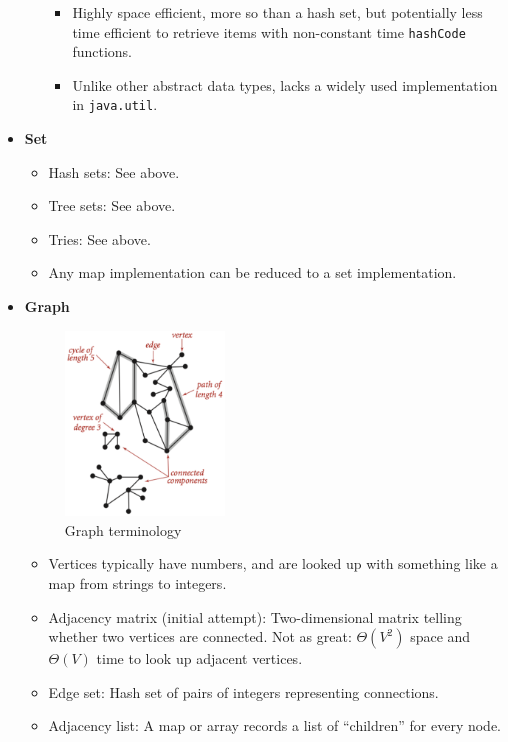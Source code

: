 \documentclass{article}
\begin{document}
\begin{itemize}
\begin{itemize}
\begin{itemize}
            \item Highly space efficient, more so than a hash set, but potentially less time efficient to retrieve items with non-constant time \texttt{hashCode} functions.
            \item Unlike other abstract data types, lacks a widely used implementation in \texttt{java.util}.
        \end{itemize}
    \end{itemize}
    \item \textbf{Set}
    \begin{itemize}
        \item Hash sets: See above.
        \item Tree sets: See above.
        \item Tries: See above.
        \item Any map implementation can be reduced to a set implementation.
    \end{itemize}
    \item \textbf{Graph}
    \begin{figure}[h]
        \centering
        \includegraphics[width=0.4\textwidth]{images/Graphs.png}
        \caption{Graph terminology}
        \label{fig:my_label}
    \end{figure}
    \begin{itemize}
        \item Vertices typically have numbers, and are looked up with something like a map from strings to integers.
        \item Adjacency matrix (initial attempt): Two-dimensional matrix telling whether two vertices are connected. Not as great: $\Theta(V^2)$ space and $\Theta(V)$ time to look up adjacent vertices.
        \item Edge set: Hash set of pairs of integers representing connections.
        \item Adjacency list: A map or array records a list of ``children'' for every node.

\end{itemize}
\end{itemize}
\end{document}
